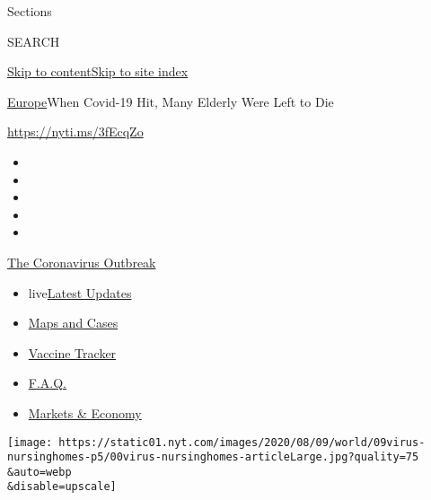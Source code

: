 Sections

SEARCH

\protect\hyperlink{site-content}{Skip to
content}\protect\hyperlink{site-index}{Skip to site index}

\href{/section/world/europe}{Europe}\textbar{}When Covid-19 Hit, Many
Elderly Were Left to Die

\href{https://nyti.ms/3fEcqZo}{https://nyti.ms/3fEcqZo}

\begin{itemize}
\item
\item
\item
\item
\item
\end{itemize}

\href{https://www.nytimes.com/news-event/coronavirus?action=click\&pgtype=Article\&state=default\&region=TOP_BANNER\&context=storylines_menu}{The
Coronavirus Outbreak}

\begin{itemize}
\tightlist
\item
  live\href{https://www.nytimes.com/2020/08/08/world/coronavirus-updates.html?action=click\&pgtype=Article\&state=default\&region=TOP_BANNER\&context=storylines_menu}{Latest
  Updates}
\item
  \href{https://www.nytimes.com/interactive/2020/us/coronavirus-us-cases.html?action=click\&pgtype=Article\&state=default\&region=TOP_BANNER\&context=storylines_menu}{Maps
  and Cases}
\item
  \href{https://www.nytimes.com/interactive/2020/science/coronavirus-vaccine-tracker.html?action=click\&pgtype=Article\&state=default\&region=TOP_BANNER\&context=storylines_menu}{Vaccine
  Tracker}
\item
  \href{https://www.nytimes.com/interactive/2020/world/coronavirus-tips-advice.html?action=click\&pgtype=Article\&state=default\&region=TOP_BANNER\&context=storylines_menu}{F.A.Q.}
\item
  \href{https://www.nytimes.com/live/2020/08/07/business/stock-market-today-coronavirus?action=click\&pgtype=Article\&state=default\&region=TOP_BANNER\&context=storylines_menu}{Markets
  \& Economy}
\end{itemize}

\texttt{[image: https://static01.nyt.com/images/2020/08/09/world/09virus-nursinghomes-p5/00virus-nursinghomes-articleLarge.jpg?quality=75\\\&auto=webp\\\&disable=upscale]}


